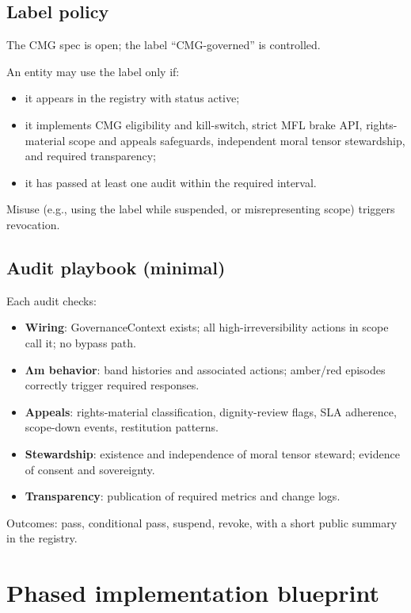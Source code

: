 \documentclass[11pt]{article}
\begin{document}
\subsection{Label policy}

The CMG spec is open; the label ``CMG-governed'' is controlled.

An entity may use the label only if:

\begin{itemize}[leftmargin=*]
  \item it appears in the registry with status active;
  \item it implements CMG eligibility and kill-switch, strict MFL brake API, rights-material scope and appeals safeguards, independent moral tensor stewardship, and required transparency;
  \item it has passed at least one audit within the required interval.
\end{itemize}

Misuse (e.g., using the label while suspended, or misrepresenting scope) triggers revocation.

\subsection{Audit playbook (minimal)}

Each audit checks:

\begin{itemize}[leftmargin=*]
  \item \textbf{Wiring}: GovernanceContext exists; all high-irreversibility actions in scope call it; no bypass path.
  \item \textbf{Λm behavior}: band histories and associated actions; amber/red episodes correctly trigger required responses.
  \item \textbf{Appeals}: rights-material classification, dignity-review flags, SLA adherence, scope-down events, restitution patterns.
  \item \textbf{Stewardship}: existence and independence of moral tensor steward; evidence of consent and sovereignty.
  \item \textbf{Transparency}: publication of required metrics and change logs.
\end{itemize}

Outcomes: pass, conditional pass, suspend, revoke, with a short public summary in the registry.

\section{Phased implementation blueprint}
\end{document}
